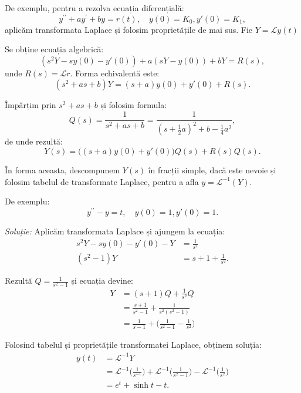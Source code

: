 \documentclass[12pt,a4paper]{article}
\newcommand\Lap{\mathcal{L}}
\theoremstyle{dotless}
\theoremstyle{dotlessdr}
\begin{document}
\vspace{1cm}

De exemplu, pentru a rezolva ecuația diferențială:
\[
  y^{\prime \prime} + ay^\prime + by = r(t), \quad y(0) = K_0, y'(0) = K_1,
\]
aplicăm transformata Laplace și folosim proprietățile de mai sus. Fie $ Y = \Lap y(t) $

Se obține ecuația algebrică:
\[
  (s^2 Y - sy(0) - y'(0)) + a(sY - y(0)) + bY = R(s),
\]
unde $ R(s) = \Lap r $. Forma echivalentă este:
\[
  (s^2 + as + b) Y = (s + a)y(0) + y'(0) + R(s).
\]

Împărțim prin $ s^2 + as + b $ și folosim formula:
\[
  Q(s) = \frac{1}{s^2 + as + b} =
  \frac{1}{(s + \frac{1}{2}a)^2 + b - \frac{1}{4}a^2},
\]
de unde rezultă:
\[
  Y(s) = \big( (s + a) y(0) + y'(0)\big) Q(s) + R(s) Q(s).
\]

În forma aceasta, descompunem $ Y(s) $ în fracții simple, dacă este nevoie și
folosim tabelul de transformate Laplace, pentru a afla $ y = \Lap^{-1}(Y) $.

\vspace{1cm}

De exemplu:
\[
  y^{\prime\prime} - y = t, \quad y(0) = 1, y'(0) = 1.
\]

\emph{Soluție:} Aplicăm transformata Laplace și ajungem la ecuația:
\begin{align*}
  s^2 Y - sy(0) - y'(0) - Y &= \frac{1}{s^2} \\
  (s^2 - 1)Y &= s + 1 + \frac{1}{s^2}.
\end{align*}

Rezultă $ Q = \frac{1}{s^2 - 1} $ și ecuația devine:
\begin{align*}
  Y &= (s + 1)Q + \frac{1}{s^2} Q \\
    &= \frac{s + 1}{s^2 - 1} + \frac{1}{s^2(s^2 - 1)} \\
    &= \frac{1}{s - 1} + \Big( \frac{1}{s^2 - 1} - \frac{1}{s^2} \Big)
\end{align*}

Folosind tabelul și proprietățile transformatei Laplace, obținem soluția:
\begin{align*}
  y(t) &= \Lap^{-1} Y \\
       &= \Lap^{-1} \Big( \frac{1}{s^{-1}} \Big) + \Lap^{-1} \Big( \frac{1}{s^2 - 1} \Big) - %
         \Lap^{-1} \Big( \frac{1}{s^2} \Big) \\
       &= e^t + \sinh t - t.
\end{align*}

\vspace{1cm}
\end{document}
